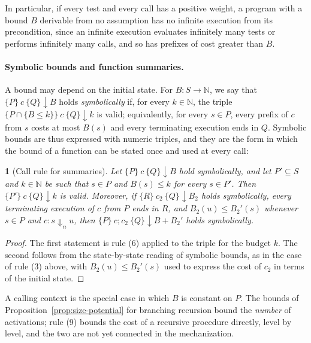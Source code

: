 \documentclass[oneside,english]{amsart}
\numberwithin{equation}{section}
\numberwithin{figure}{section}
\theoremstyle{plain}
\theoremstyle{definition}
\theoremstyle{plain}
\newtheorem{prop}[thm]{\protect\propositionname}
\theoremstyle{remark}
\theoremstyle{plain}
\theoremstyle{definition}
\theoremstyle{plain}
\theoremstyle{remark}
\providecommand{\propositionname}{Proposition}
\begin{document}
In particular, if every test and every call has a positive weight, a program with a bound $B$ derivable from no assumption has no infinite execution from its precondition, since an infinite execution evaluates infinitely many tests or performs infinitely many calls, and so has prefixes of cost greater than $B$.

\paragraph{Symbolic bounds and function summaries.}
A bound may depend on the initial state. For $B : S \to \mathbb{N}$, we say that $\{P\}\ c\ \{Q\}\!\downarrow\! B$ holds \emph{symbolically} if, for every $k \in \mathbb{N}$, the triple $\{P \cap \{B \le k\}\}\ c\ \{Q\}\!\downarrow\! k$ is valid; equivalently, for every $s \in P$, every prefix of $c$ from $s$ costs at most $B(s)$ and every terminating execution ends in $Q$. Symbolic bounds are thus expressed with numeric triples, and they are the form in which the bound of a function can be stated once and used at every call:

\begin{prop}[Call rule for summaries]
\label{prop:summary-call}
Let $\{P\}\ c\ \{Q\}\!\downarrow\! B$ hold symbolically, and let $P' \subseteq S$ and $k \in \mathbb{N}$ be such that $s \in P$ and $B(s) \le k$ for every $s \in P'$. Then $\{P'\}\ c\ \{Q\}\!\downarrow\! k$ is valid. Moreover, if $\{R\}\ c_2\ \{Q\}\!\downarrow\! B_2$ holds symbolically, every terminating execution of $c$ from $P$ ends in $R$, and $B_2(u) \le B_2'(s)$ whenever $s \in P$ and $c : s \Downarrow_n u$, then $\{P\}\ c ; c_2\ \{Q\}\!\downarrow\! B + B_2'$ holds symbolically.
\end{prop}

\begin{proof}
The first statement is rule (6) applied to the triple for the budget $k$. The second follows from the state-by-state reading of symbolic bounds, as in the case of rule (3) above, with $B_2(u) \le B_2'(s)$ used to express the cost of $c_2$ in terms of the initial state.
\end{proof}

A calling context is the special case in which $B$ is constant on $P$. The bounds of Proposition~\ref{prop:size-potential} for branching recursion bound the \emph{number} of activations; rule (9) bounds the cost of a recursive procedure directly, level by level, and the two are not yet connected in the mechanization.
\end{document}
